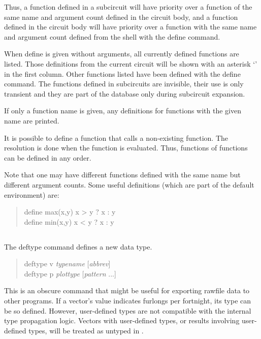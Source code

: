 Thus, a function defined in a subcircuit will have priority over a
function of the same name and argument count defined in the circuit
body, and a function defined in the circuit body will have priority
over a function with the same name and argument count defined from the
shell with the {\cb define} command.

When {\cb define} is given without arguments, all currently defined
functions are listed.  Those definitions from the current circuit will
be shown with an asterisk `{\vt *}' in the first column.  Other
functions listed have been defined with the {\cb define} command.  The
functions defined in subcircuits are invisible, their use is only
transient and they are part of the database only during subcircuit
expansion.

If only a function name is given, any definitions for functions with
the given name are printed.

It is possible to define a function that calls a non-existing
function.  The resolution is done when the function is evaluated. 
Thus, functions of functions can be defined in any order.

Note that one may have different functions defined with the same name
but different argument counts.  Some useful definitions (which are
part of the default environment) are:
\begin{quote} \vt
define max(x,y) x > y ? x : y\\
define min(x,y) x < y ? x : y
\end{quote}

\subsection{}


The {\cb deftype} command defines a new data type.
\begin{quote}\vt
    deftype v {\it typename} [{\it abbrev\/}]\\
    deftype p {\it plottype} [{\it pattern} ...]
\end{quote}
This is an obscure command that might be useful for exporting rawfile
data to other programs.  If a vector's value indicates furlongs per
fortnight, its type can be so defined.  However, user-defined types
are not compatible with the internal {\WRspice} type propagation
logic.  Vectors with user-defined types, or results involving
user-defined types, will be treated as untyped in {\WRspice}.

